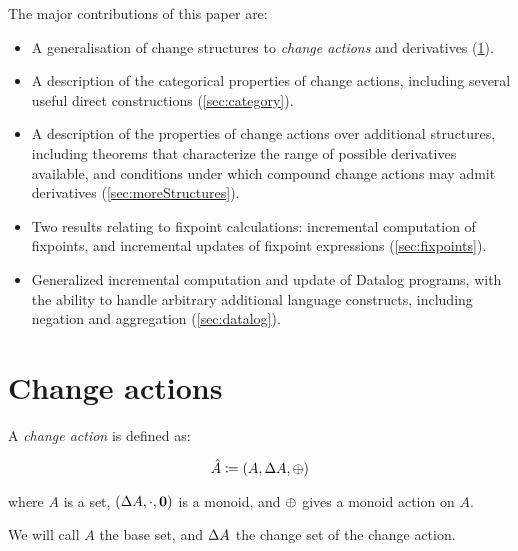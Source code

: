 The major contributions of this paper are:
\begin{itemize}
  \item A generalisation of change structures to \textit{change actions} and derivatives
    (\cref{sec:changeActions}).
  \item A description of the categorical properties of change actions, including
    several useful direct constructions (\cref{sec:category}).
  \item A description of the properties of change actions over
    additional structures, including theorems that characterize the range of
    possible derivatives available, and conditions under which compound change
    actions may admit derivatives (\cref{sec:moreStructures}).
  \item Two results relating to fixpoint calculations: incremental computation
    of fixpoints, and incremental updates of fixpoint expressions (\cref{sec:fixpoints}).
  \item Generalized incremental computation and
    update of Datalog programs, with the ability to handle arbitrary additional
    language constructs, including negation and aggregation (\cref{sec:datalog}).
\end{itemize}

\section{Change actions}
\label{sec:changeActions}



\begin{defn}
  A \textit{change action} is defined as:

  $$\hat{A} \coloneqq (A,\Delta A,\oplus)$$

  where $A$ is a set, $(\Delta A, \cdot, \textbf{0})$ is a monoid, and $\oplus$ gives a monoid action on $A$.

  We will call $A$ the base set, and $\Delta A$ the change set of the change action.
\end{defn}

